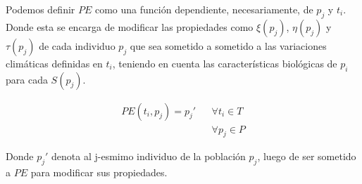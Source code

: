 Podemos definir $PE$ como una función dependiente, necesariamente, de $p_{j}$ y $t_{i}$. Donde esta se encarga
de modificar las propiedades como $\xi(p_{j})$, $\eta(p_{j})$ y $\tau(p_{j})$ de cada individuo $p_{j}$ que sea
sometido a sometido a las variaciones climáticas definidas en $t_{i}$, teniendo en  cuenta las características
biológicas de $p_{i}$ para cada $S(p_{j})$.

\begin{align*}
PE (t_{i}, p_{j}) = p_{j}' & & \forall t_{i} \in T\\
& & \forall p_{j} \in P 
\end{align*}

Donde $p_{j}'$ denota al j-esmimo individuo de la población $p_{j}$, luego de ser sometido a $PE$ para modificar
sus propiedades.  
